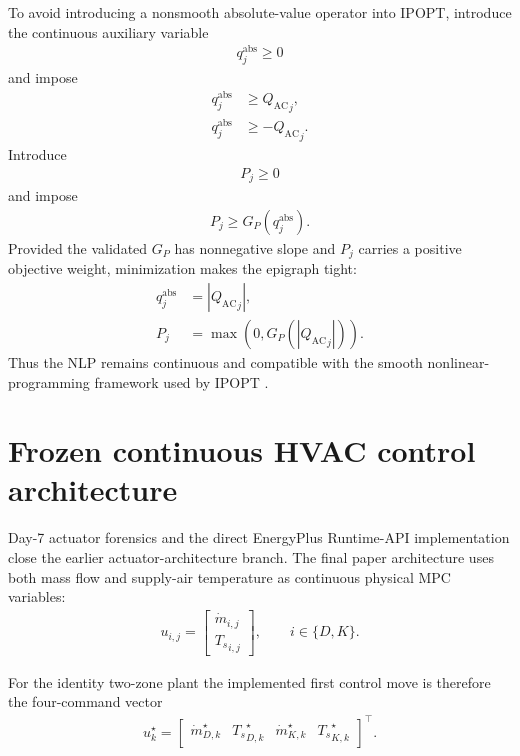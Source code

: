 \documentclass[11pt]{article}
\newcommand{\Ts}{T_s}
\newcommand{\mdot}{\dot m}
\newcommand{\QAC}{Q_{\mathrm{AC}}}
\begin{document}
To avoid introducing a nonsmooth absolute-value operator into IPOPT, introduce the continuous
auxiliary variable
\begin{align}
q^{\mathrm{abs}}_j\ge0
\end{align}
and impose
\begin{align}
q^{\mathrm{abs}}_j&\ge {\QAC}_j,
\\
q^{\mathrm{abs}}_j&\ge-{\QAC}_j.
\tag{6.26}
\end{align}
Introduce
\begin{align}
P_j\ge0
\end{align}
and impose
\begin{align}
P_j\ge G_P(q^{\mathrm{abs}}_j).
\tag{6.27}
\end{align}
Provided the validated \(G_P\) has nonnegative slope and \(P_j\) carries a positive objective
weight, minimization makes the epigraph tight:
\begin{align}
q^{\mathrm{abs}}_j&=|{\QAC}_j|,
\\
P_j&=\max\!\left(0,G_P(|{\QAC}_j|)\right).
\tag{6.28}
\end{align}
Thus the NLP remains continuous and compatible with the smooth nonlinear-programming framework
used by IPOPT \citep{wachter2006ipopt}.

\section{Frozen continuous HVAC control architecture}

Day-7 actuator forensics and the direct EnergyPlus Runtime-API implementation
close the earlier actuator-architecture branch.  The final paper architecture
uses both mass flow and supply-air temperature as continuous physical MPC
variables:
\begin{align}
\boxed{
u_{i,j}
=
\begin{bmatrix}
\mdot_{i,j}\\
{\Ts}_{i,j}
\end{bmatrix},
\qquad
i\in\{D,K\}.
}
\tag{6.29}
\end{align}

For the identity two-zone plant the implemented first control move is therefore
the four-command vector
\begin{align}
\boxed{
u_k^\star
=
\begin{bmatrix}
\mdot_{D,k}^\star &
{\Ts}_{D,k}^\star &
\mdot_{K,k}^\star &
{\Ts}_{K,k}^\star
\end{bmatrix}^{\!\top}.
}
\tag{6.30}
\end{align}
\end{document}
